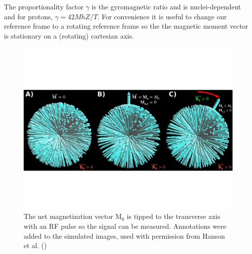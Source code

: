 The proportionality factor $\gamma$ is the gyromagnetic ratio and is nuclei-dependent and for protons, $\gamma = 42 MhZ /T$.
For convenience it is useful to change our reference frame to a rotating reference frame so the the magnetic moment vector is stationary on a (rotating) cartesian axis.

\begin{figure}
	\centering
	\includegraphics[width=\textwidth]{./intro/intro-images/HansonMRI.pdf}
	\caption[Spins getting tipped with an RF pulse]{The net magnetization vector M$_0$ is tipped to the transverse axis with an RF pulse so the signal can be measured. 
Annotations were added to the simulated images, used with permission from Hanson et al. 
(\cite{Hanson:2008tp})}
	\label{spinsB0B1}
\end{figure}

